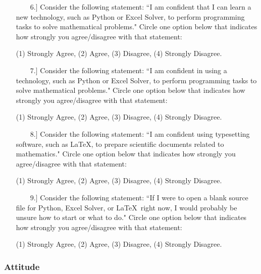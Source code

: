 \documentclass[11pt]{article}
\begin{document}
\begin{enumerate}


\item[{$\qquad 6.]$}] Consider the following statement: ``I am confident that I can learn a new technology, such as Python or Excel Solver, to perform programming tasks to solve mathematical problems."  Circle one option below that indicates how strongly you agree/disagree with that statement:  
\begin{center} 
(1) Strongly Agree, \qquad (2) Agree, \qquad (3) Disagree, \qquad (4) Strongly Disagree. \end{center}


\item[{$\qquad 7.]$}] Consider the following statement: ``I am confident in using a technology, such as Python or Excel Solver, to perform programming tasks to solve mathematical problems."  Circle one option below that indicates how strongly you agree/disagree with that statement:  
\begin{center} 
(1) Strongly Agree, \qquad (2) Agree, \qquad (3) Disagree, \qquad (4) Strongly Disagree. \end{center}


\item[{$\qquad 8.]$}] Consider the following statement: ``I am confident using typesetting software, such as \LaTeX, to prepare scientific documents related to mathematics."  Circle one option below that indicates how strongly you agree/disagree with that statement:  
\begin{center} 
(1) Strongly Agree, \qquad (2) Agree, \qquad (3) Disagree, \qquad (4) Strongly Disagree. \end{center}

\item[{$\qquad 9.]$}] Consider the following statement: ``If I were to open a blank source file for Python, Excel Solver, or \LaTeX\, right now, I would probably be unsure how to start or what to do."  Circle one option below that indicates how strongly you agree/disagree with that statement:  
\begin{center} 
(1) Strongly Agree, \qquad (2) Agree, \qquad (3) Disagree, \qquad (4) Strongly Disagree. \end{center}


\end{enumerate}

\subsubsection*{Attitude}
\end{document}
